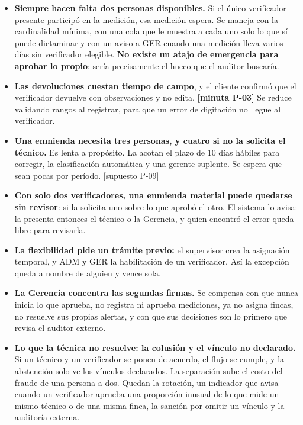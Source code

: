 \documentclass[11pt,letterpaper]{article}
\newcommand{\resp}[1]{\textrm{\footnotesize\bfseries [minuta #1]}}
\newcommand{\supu}[1]{\textrm{\footnotesize [supuesto #1]}}
\begin{document}
\begin{itemize}
\item \textbf{Siempre hacen falta dos personas disponibles.} Si el único verificador presente participó en
      la medición, esa medición espera. Se maneja con la cardinalidad mínima, con una cola que le
      muestra a cada uno solo lo que sí puede dictaminar y con un aviso a GER cuando una medición
      lleva varios días sin verificador elegible. \textbf{No existe un atajo de emergencia para
      aprobar lo propio}: sería precisamente el hueco que el auditor buscaría.
\item \textbf{Las devoluciones cuestan tiempo de campo}, y el cliente confirmó que el verificador
      devuelve con observaciones y no edita. \resp{P-03} Se reduce validando rangos al registrar,
      para que un error de digitación no llegue al verificador.
\item \textbf{Una enmienda necesita tres personas, y cuatro si no la solicita el técnico.} Es lenta a
      propósito. La acotan el plazo de 10 días hábiles para corregir, la clasificación automática
      y una gerente suplente. Se espera que sean pocas por período. \supu{P-09}
\item \textbf{Con solo dos verificadores, una enmienda material puede quedarse sin revisor}: si la
      solicita uno sobre lo que aprobó el otro. El sistema lo avisa: la presenta entonces el técnico
      o la Gerencia, y quien encontró el error queda libre para revisarla.
\item \textbf{La flexibilidad pide un trámite previo:} el supervisor crea la asignación temporal, y
      ADM y GER la habilitación de un verificador. Así la excepción queda a nombre de alguien y vence sola.
\item \textbf{La Gerencia concentra las segundas firmas.} Se compensa con que nunca inicia lo que
      aprueba, no registra ni aprueba mediciones, ya no asigna fincas, no resuelve sus propias
      alertas, y con que sus decisiones son lo primero que revisa el auditor externo.
\item \textbf{Lo que la técnica no resuelve: la colusión y el vínculo no declarado.} Si un técnico y un
      verificador se ponen de acuerdo, el flujo se cumple, y la abstención solo ve los vínculos
      declarados. La separación sube el costo del fraude de una persona a dos. Quedan la rotación,
      un indicador que avisa cuando un verificador aprueba una proporción inusual de lo que mide un
      mismo técnico o de una misma finca, la sanción por omitir un vínculo y la auditoría externa.
\end{itemize}
\end{document}
